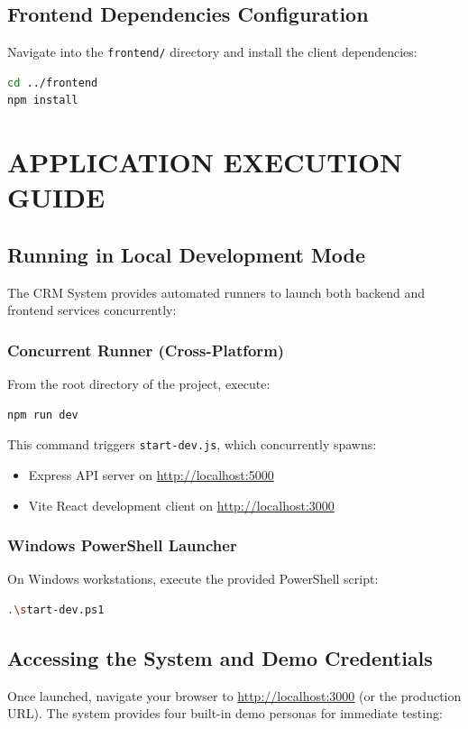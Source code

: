 \section{Frontend Dependencies Configuration}
Navigate into the \texttt{frontend/} directory and install the client dependencies:
\begin{lstlisting}[language=bash]
cd ../frontend
npm install
\end{lstlisting}

\chapter{APPLICATION EXECUTION GUIDE}
\label{app:execution}

\section{Running in Local Development Mode}
The CRM System provides automated runners to launch both backend and frontend services concurrently:

\subsection{Concurrent Runner (Cross-Platform)}
From the root directory of the project, execute:
\begin{lstlisting}[language=bash]
npm run dev
\end{lstlisting}
This command triggers \texttt{start-dev.js}, which concurrently spawns:
\begin{itemize}
    \item Express API server on \url{http://localhost:5000}
    \item Vite React development client on \url{http://localhost:3000}
\end{itemize}

\subsection{Windows PowerShell Launcher}
On Windows workstations, execute the provided PowerShell script:
\begin{lstlisting}[language=bash]
.\start-dev.ps1
\end{lstlisting}

\section{Accessing the System and Demo Credentials}
Once launched, navigate your browser to \url{http://localhost:3000} (or the production URL). The system provides four built-in demo personas for immediate testing:

